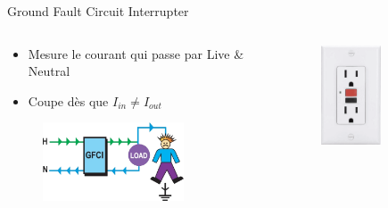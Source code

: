 \begin{frame}{Ground Fault Circuit Interrupter}
    \begin{columns}
        \begin{column}{0.7\textwidth}
            \begin{itemize}
                \item Mesure le courant qui passe par Live \& Neutral
                \item Coupe dès que $I_{in} \neq I_{out}$ 
            \end{itemize}
            \vspace{24pt}
            \begin{figure}
                \centering
                \includegraphics[width=0.75\textwidth]{pictures/gfci-example.png}
            \end{figure}
        \end{column}
        \begin{column}{0.3\textwidth}
            \begin{figure}
                \centering
                \includegraphics[width=0.6\textwidth]{pictures/gfci-outlet.png}
            \end{figure}
        \end{column}
    \end{columns}
\end{frame}